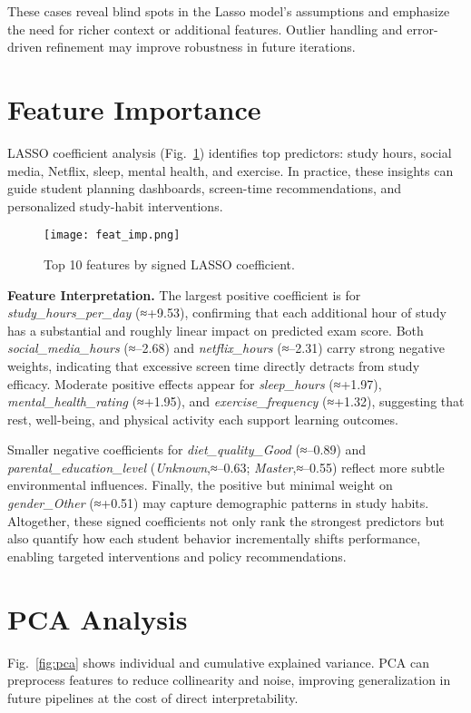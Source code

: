 \documentclass[conference]{IEEEtran}
\begin{document}
These cases reveal blind spots in the Lasso model’s assumptions and emphasize the need for richer context or additional features. Outlier handling and error-driven refinement may improve robustness in future iterations.



\section{Feature Importance}
LASSO coefficient analysis (Fig.~\ref{fig:feat_imp}) identifies top predictors: study hours, social media, Netflix, sleep, mental health, and exercise. In practice, these insights can guide student planning dashboards, screen-time recommendations, and personalized study-habit interventions.

\begin{figure}[htbp]
  \centering
  \texttt{[image: feat\_imp.png]}
  \caption{Top 10 features by signed LASSO coefficient.}
  \label{fig:feat_imp}
\end{figure}

\noindent\textbf{Feature Interpretation.}
The largest positive coefficient is for \emph{study\_hours\_per\_day} (≈+9.53), confirming that each additional hour of study has a substantial and roughly linear impact on predicted exam score. Both \emph{social\_media\_hours} (≈–2.68) and \emph{netflix\_hours} (≈–2.31) carry strong negative weights, indicating that excessive screen time directly detracts from study efficacy. Moderate positive effects appear for \emph{sleep\_hours} (≈+1.97), \emph{mental\_health\_rating} (≈+1.95), and \emph{exercise\_frequency} (≈+1.32), suggesting that rest, well-being, and physical activity each support learning outcomes. 

Smaller negative coefficients for \emph{diet\_quality\_Good} (≈–0.89) and \emph{parental\_education\_level} (\emph{Unknown},≈–0.63; \emph{Master},≈–0.55) reflect more subtle environmental influences. Finally, the positive but minimal weight on \emph{gender\_Other} (≈+0.51) may capture demographic patterns in study habits. Altogether, these signed coefficients not only rank the strongest predictors but also quantify how each student behavior incrementally shifts performance, enabling targeted interventions and policy recommendations.


\section{PCA Analysis}
Fig.~\ref{fig:pca} shows individual and cumulative explained variance. PCA can preprocess features to reduce collinearity and noise, improving generalization in future pipelines at the cost of direct interpretability.
\end{document}
